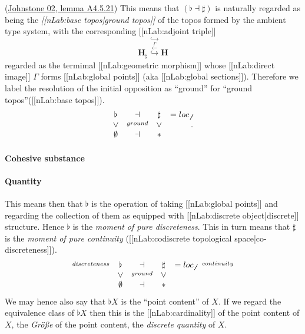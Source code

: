 \documentclass[12pt,titlepage]{article}
\newcommand{\itexarray}[1]{\begin{matrix}#1\end{matrix}}
\theoremstyle{plain}
\theoremstyle{definition}
\theoremstyle{remark}
\begin{document}
(\hyperlink{Johnstone02}{Johnstone 02, lemma A4.5.21})
This means that $(\flat \dashv \sharp)$ is naturally regarded as being the \emph{[[nLab:base topos|ground topos]]} of the topos formed by the ambient type system, with the corresponding [[nLab:adjoint triple]]
\begin{displaymath}
\mathbf{H}_{\sharp}
  \stackrel{\hookrightarrow}{\stackrel{\stackrel{\Gamma}{\longleftarrow}}{\hookrightarrow}}
  \mathbf{H}
\end{displaymath}
regarded as the termimal [[nLab:geometric morphism]] whose [[nLab:direct image]] $\Gamma$ forms [[nLab:global points]] (aka [[nLab:global sections]]).
Therefore we label the resolution of the initial opposition as ``ground'' for ``ground topos''([[nLab:base topos]]).
\begin{displaymath}
\itexarray{
     \flat &\dashv& \sharp & = loc_{\not\not}
     \\
     \vee &\stackrel{ground}{}& \vee
     \\
     \emptyset &\dashv& \ast
  }
  \,.
\end{displaymath}
\hypertarget{cohesive_substance}{}\paragraph*{{Cohesive substance}}\label{cohesive_substance}
\hypertarget{IntensiveExtensive}{}\paragraph*{{Quantity}}\label{IntensiveExtensive}
This means then that $\flat$ is the operation of taking [[nLab:global points]] and regarding the collection of them as equipped with [[nLab:discrete object|discrete]] structure. Hence $\flat$ is the \emph{moment of pure discreteness}.
This in turn means that $\sharp$ is the \emph{moment of pure continuity} ([[nLab:codiscrete topological space|co-discreteness]]).
\begin{displaymath}
\itexarray{
     \stackrel{discreteness}{} & \flat &\dashv& \sharp &= loc_{\not\not}& \stackrel{continuity}{}
     \\
     & \vee &\stackrel{ground}{}& \vee
     \\
     & \emptyset &\dashv& \ast &
  }
\end{displaymath}
We may hence also say that $\flat X$ is the ``point content'' of $X$. If we regard the equivalence class of $\flat X$ then this is the [[nLab:cardinality]] of the point content of $X$, the \emph{Größe} of the point content, the \emph{discrete quantity} of $X$.
\end{document}
